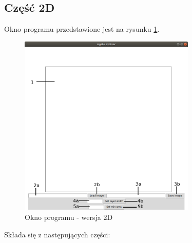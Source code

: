\documentclass{article}
\begin{document}
\subsection{Część 2D}
Okno programu przedstawione jest na rysunku \ref{okno_programu_2d}.
\begin{figure}[H]
\caption{Okno programu - wersja 2D}
\label{okno_programu_2d}
\centering
\includegraphics[width=0.75\textwidth]{obrazy/okno_programu_2d.png}
\end{figure}
Składa się z następujących części:
\end{document}
